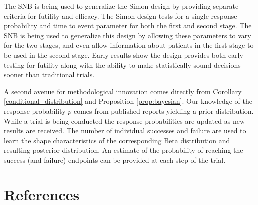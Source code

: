 \documentclass[review]{elsarticle}
\begin{document}
The SNB is being used to generalize the Simon design by providing separate
criteria for futility and efficacy.
The Simon design tests for a single response probability and time to event
parameter for both the first
and second stage. The SNB is being used to generalize this design by 
allowing these parameters to vary for the two stages, and even allow
information about patients in the first stage to be used in the second
stage. Early results show the design provides
both early testing for futility along with the ability
to make statistically sound decisions sooner than traditional trials.

A second avenue for methodological innovation comes directly from
Corollary \ref{conditional_distribution} and Proposition \ref{prop:bayesian}.
Our knowledge of the response probability $p$ comes from published reports
yielding a prior distribution.
While a trial is being conducted the response probabilities are 
updated as new results are received. The number of individual successes
and failure are used to learn the shape characteristics of the corresponding
Beta distribution and resulting posterior
distribution. An estimate of the probability of reaching the success (and
failure) endpoints can be provided at each step of the trial.



\section*{References}


\end{document}
